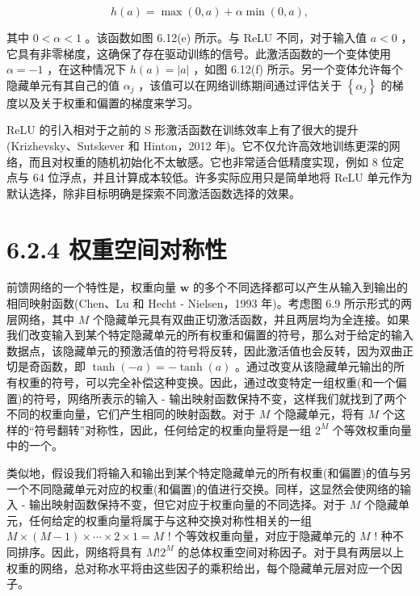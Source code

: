 \documentclass[10pt]{report}
\begin{document}
\[
h\left( a\right)  = \max \left( {0,a}\right)  + \alpha \min \left( {0,a}\right) , \tag{6.18}
\]

其中 \(0 < \alpha  < 1\) 。该函数如图 6.12(e) 所示。与 ReLU 不同，对于输入值 \(a < 0\) ，它具有非零梯度，这确保了存在驱动训练的信号。此激活函数的一个变体使用 \(\alpha  =  - 1\) ，在这种情况下 \(h\left( a\right)  = \left| a\right|\) ，如图 6.12(f) 所示。另一个变体允许每个隐藏单元有其自己的值 \({\alpha }_{j}\) ，该值可以在网络训练期间通过评估关于 \(\left\{  {\alpha }_{j}\right\}\) 的梯度以及关于权重和偏置的梯度来学习。

ReLU 的引入相对于之前的 S 形激活函数在训练效率上有了很大的提升(Krizhevsky、Sutskever 和 Hinton，2012 年)。它不仅允许高效地训练更深的网络，而且对权重的随机初始化不太敏感。它也非常适合低精度实现，例如 8 位定点与 64 位浮点，并且计算成本较低。许多实际应用只是简单地将 ReLU 单元作为默认选择，除非目标明确是探索不同激活函数选择的效果。

\section*{6.2.4 权重空间对称性}

前馈网络的一个特性是，权重向量 \(\mathbf{w}\) 的多个不同选择都可以产生从输入到输出的相同映射函数(Chen、Lu 和 Hecht - Nielsen，1993 年)。考虑图 6.9 所示形式的两层网络，其中 \(M\) 个隐藏单元具有双曲正切激活函数，并且两层均为全连接。如果我们改变输入到某个特定隐藏单元的所有权重和偏置的符号，那么对于给定的输入数据点，该隐藏单元的预激活值的符号将反转，因此激活值也会反转，因为双曲正切是奇函数，即 \(\tanh \left( {-a}\right)  =  - \tanh \left( a\right)\) 。通过改变从该隐藏单元输出的所有权重的符号，可以完全补偿这种变换。因此，通过改变特定一组权重(和一个偏置)的符号，网络所表示的输入 - 输出映射函数保持不变，这样我们就找到了两个不同的权重向量，它们产生相同的映射函数。对于 \(M\) 个隐藏单元，将有 \(M\) 个这样的“符号翻转”对称性，因此，任何给定的权重向量将是一组 \({2}^{M}\) 个等效权重向量中的一个。

类似地，假设我们将输入和输出到某个特定隐藏单元的所有权重(和偏置)的值与另一个不同隐藏单元对应的权重(和偏置)的值进行交换。同样，这显然会使网络的输入 - 输出映射函数保持不变，但它对应于权重向量的不同选择。对于 \(M\) 个隐藏单元，任何给定的权重向量将属于与这种交换对称性相关的一组 \(M \times  \left( {M - 1}\right)  \times  \cdots  \times  2 \times  1 = M\) ! 个等效权重向量，对应于隐藏单元的 \(M\) ! 种不同排序。因此，网络将具有 \(M!{2}^{M}\) 的总体权重空间对称因子。对于具有两层以上权重的网络，总对称水平将由这些因子的乘积给出，每个隐藏单元层对应一个因子。
\end{document}
